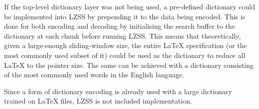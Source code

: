 \documentclass[11pt]{article}
\begin{document}
    If the top-level dictionary layer was not being used, a pre-defined dictionary could be implemented into LZSS by prepending it to the data being encoded.
    This is done for both encoding and decoding by initialising the search buffer to the dictionary at each chunk before running LZSS\@.
    This means that theoretically, given a large-enough sliding-window size, the entire \LaTeX{} specification (or the most commonly used subset of it) could be used as the dictionary to reduce all \LaTeX{} to the pointer size.
    The same can be achieved with a dictionary consisting of the most commonly used words in the English language.

    Since a form of dictionary encoding is already used with a large dictionary trained on \LaTeX{} files, LZSS is not included implementation.


    
    
\end{document}
